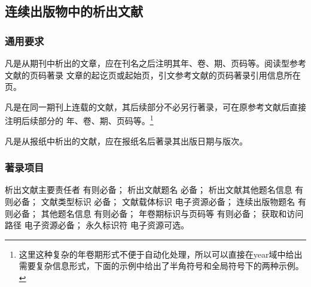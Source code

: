 \documentclass{article}
\begin{document}
\subsection{连续出版物中的析出文献}

\subsubsection{通用要求}

凡是从期刊中析出的文章，应在刊名之后注明其年、卷、期、页码等。阅读型参考文献的页码著录
文章的起讫页或起始页，引文参考文献的页码著录引用信息所在页。

\begin{refsection}

\nocite{egdatevolnumpagea--,egdatevolnumpageb--,%
egdatevolnumpagec--,egdatevolnumpaged--,%
egdatevolnumpagee--}

{}
\end{refsection}

凡是在同一期刊上连载的文献，其后续部分不必另行著录，可在原参考文献后直接注明后续部分的
年、卷、期、页码等。\footnote{这里这种复杂的年卷期形式不便于自动化处理，所以可以直接在year域中给出需要复杂信息形式，下面的示例中给出了半角符号和全局符号下的两种示例。}

\begin{refsection}

\nocite{egdatevolnumpagef--,egdatevolnumpagefull--}

{}
\end{refsection}


凡是从报纸中析出的文献，应在报纸名后著录其出版日期与版次。


\begin{refsection}

\nocite{egdatevolnumpageg--}

{}
\end{refsection}


\subsubsection{著录项目}

析出文献主要责任者 有则必备；
析出文献题名 必备；
析出文献其他题名信息 有则必备；
文献类型标识 必备；
文献载体标识 电子资源必备；
连续出版物题名 有则必备；
其他题名信息 有则必备；
年卷期标识与页码等 有则必备；
获取和访问路径 电子资源必备；
永久标识符 电子资源可选。
\end{document}
